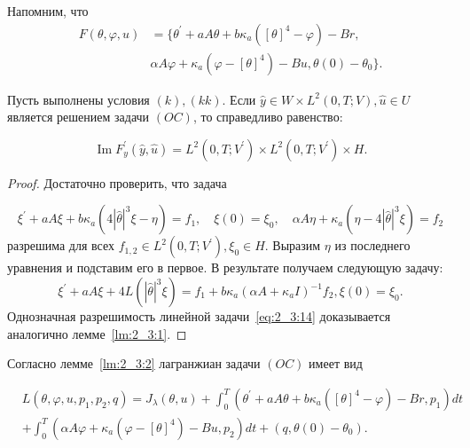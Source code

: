 Напомним, что
\begin{equation*}
    \begin{aligned}
        F(\theta, \varphi, u) &=\{\theta^{\prime}+
        a A \theta+b \kappa_{a}\left([\theta]^{4}-\varphi\right)-B r, \\
        &\alpha A \varphi+\kappa_{a}\left(\varphi-[\theta]^{4}\right)-B u,
        \theta(0)-\theta_{0}\}.
    \end{aligned}
\end{equation*}
\begin{lemma}
    \label{lm:2_3:2}
    Пусть выполнены условия $(k), (kk)$.
    Если $\widehat{y} \in W \times L^{2}(0, T ; V), \widehat{u} \in U$
    является решением задачи $(OC)$, то справедливо равенство:

    \[
        \operatorname{Im} F_{y}^{\prime}
        (\widehat{y}, \widehat{u})=L^{2}\left(0, T; V^{\prime}\right)
        \times L^{2}\left(0, T; V^{\prime}\right) \times H.
    \]
\end{lemma}

\begin{proof}
    Достаточно проверить, что задача

    \[
        \xi^{\prime}+a A \xi+b \kappa_{a}\left(4|\widehat{\theta}|^{3}
        \xi-\eta\right)=f_{1}, \quad \xi(0)=\xi_{0},
        \quad \alpha A \eta+\kappa_{a}\left(\eta-4|\widehat{\theta}|^{3} \xi\right)=f_{2}
    \]
    разрешима для всех $f_{1,2} \in L^{2}\left(0, T; V^{\prime}\right), \xi_{0} \in H$.
    Выразим $\eta$ из последнего уравнения и подставим его в первое.
    В результате получаем следующую задачу:
    \begin{equation}
        \label{eq:2_3:14}
        \xi^{\prime}+a A \xi+4 L\left(|\widehat{\theta}|^{3}
        \xi\right)=f_{1}+b \kappa_{a}\left(\alpha A+\kappa_{a}
        I\right)^{-1} f_{2}, \xi(0)=\xi_{0}.
    \end{equation}
    Однозначная разрешимость линейной задачи~\eqref{eq:2_3:14}
    доказывается аналогично лемме~\ref{lm:2_3:1}.
\end{proof}


Согласно лемме~\ref{lm:2_3:2} лагранжиан задачи $(OC)$ имеет вид

\[
    \begin{aligned}
        & L\left(\theta, \varphi, u, p_{1}, p_{2}, q\right)=
        J_{\lambda}(\theta, u) +\int_{0}^{T}\left(\theta^{\prime}
        + a A \theta+b \kappa_{a}\left([\theta]^{4}-\varphi\right)
        - B r, p_{1}\right) d t \\
        & + \int_{0}^{T}\left(\alpha A \varphi
        + \kappa_{a}\left(\varphi-[\theta]^{4}\right)
        -B u, p_{2}\right) d t+\left(q, \theta(0)-\theta_{0}\right).
    \end{aligned}
\]


